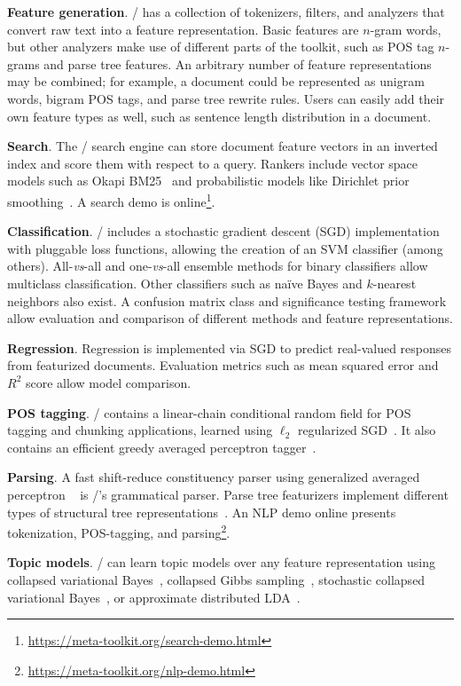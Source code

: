 \textbf{Feature generation}.
\meta/ has a collection of tokenizers, filters, and analyzers that convert raw
text into a feature representation. Basic features are $n$-gram words, but other
analyzers make use of different parts of the toolkit, such as POS tag $n$-grams
and parse tree features. An arbitrary number of feature representations may be
combined; for example, a document could be represented as unigram words, bigram
POS tags, and parse tree rewrite rules. Users can easily add their own feature
types as well, such as sentence length distribution in a document.

\textbf{Search}.
The \meta/ search engine can store document feature vectors in an inverted index
and score them with respect to a query. Rankers include vector space models such
as Okapi BM25~\cite{bm25} and probabilistic models like Dirichlet prior
smoothing~\cite{zhai-lm}. A search demo is
online\footnote{\url{https://meta-toolkit.org/search-demo.html}}.

\textbf{Classification}.
\meta/ includes a stochastic gradient descent (SGD) implementation with
pluggable loss functions, allowing the creation of an SVM classifier (among
others). All-\emph{vs}-all and one-\emph{vs}-all ensemble methods for binary
classifiers allow multiclass classification. Other classifiers such as na{\"i}ve
Bayes and $k$-nearest neighbors also exist. A confusion matrix class and
significance testing framework allow evaluation and comparison of different
methods and feature representations.

\textbf{Regression}.
Regression is implemented via SGD to predict real-valued responses from
featurized documents. Evaluation metrics such as mean squared error and $R^2$
score allow model comparison.

\textbf{POS tagging}.
\meta/ contains a linear-chain conditional random field for POS tagging and
chunking applications, learned using $\ell_2$ regularized SGD~\cite{crf}. It
also contains an efficient greedy averaged perceptron tagger~\cite{greedy}.

\textbf{Parsing}.
A fast shift-reduce constituency parser using generalized averaged perceptron
~\cite{const-parsing} is \meta/'s grammatical parser. Parse tree featurizers
implement different types of structural tree representations~\cite{structural}.
An NLP demo online presents tokenization, POS-tagging, and
parsing\footnote{\url{https://meta-toolkit.org/nlp-demo.html}}.

\textbf{Topic models}.
\meta/ can learn topic models over any feature representation using collapsed
variational Bayes~\cite{cvb}, collapsed Gibbs sampling~\cite{gibbs}, stochastic
collapsed variational Bayes~\cite{scvb}, or approximate distributed
LDA~\cite{pargibbs}.

